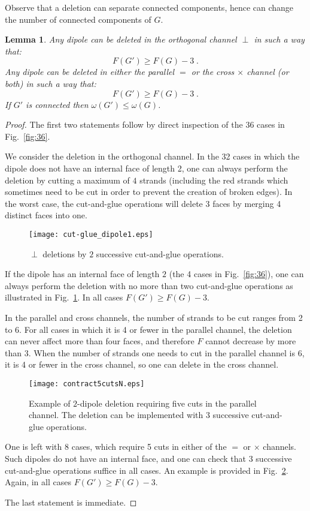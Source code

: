 \documentclass[10pt]{article}
\theoremstyle{plain}
\newtheorem{lemma}{Lemma}
\theoremstyle{definition}
\begin{document}
Observe that a deletion can separate  connected components, hence can change the number of connected components of $G$. 

\begin{lemma} 
 Any dipole can be deleted in the orthogonal channel $\perp$ in such a way that:
 \[
  F(G') \ge F(G)-3 \;.
 \]
 Any dipole can be deleted in either the parallel $=$ or the cross $\times$ channel (or both) in such a way that:
 \[
  F(G') \ge F(G)-3 \;.
 \]
 If $G'$ is connected then $\omega(G')\le \omega(G)$.
\end{lemma}
\begin{proof}
The first two statements follow by direct inspection of the 36 cases in Fig.~\ref{fig:36}. 

We consider the deletion in the orthogonal channel. In the 32 cases in which the dipole does not have an internal face of length 2,
one can always perform the deletion by cutting a maximum of $4$ strands (including the red strands which sometimes need to be cut in order to prevent the creation of broken edges).
In the worst case, the cut-and-glue operations will delete 3 faces by merging 4 distinct faces into one.
 \begin{figure}[htb]
 \begin{center}
 \texttt{[image: cut-glue\_dipole1.eps]}  
 \caption{$\perp$ deletions by $2$ successive cut-and-glue operations.} \label{fig:cut-glue_dipole1}
 \end{center}
 \end{figure}
If the dipole has an internal face of length $2$ (the 4 cases in Fig.~\ref{fig:36}), one can always perform the deletion with no more than two cut-and-glue operations
as illustrated in Fig.~\ref{fig:cut-glue_dipole1}. In all cases $F(G') \ge F(G) - 3$. 
 
In the parallel and cross channels, the number of strands to be cut ranges from 2 to 6. For all cases in which it is 4 or fewer in the parallel channel,
the deletion can never affect more than four faces, and therefore $F$ cannot decrease by more than 3. When the number of strands one needs to cut in the parallel channel is 6, 
it is 4 or fewer in the cross channel, so one can delete in the cross channel. 

 \begin{figure}[htb]
 \begin{center}
 \texttt{[image: contract5cutsN.eps]}  
 \caption{Example of $2$-dipole deletion requiring five cuts in the parallel channel. 
The deletion can be implemented with $3$ successive cut-and-glue operations.} \label{fig:contract5cuts}
 \end{center}
 \end{figure}

One is left with 8 cases, which require 5 cuts in either of the $=$ or $\times$ channels.
Such dipoles do not have an internal face, and one can check that $3$ successive cut-and-glue operations suffice in all cases.
An example is provided in Fig.~\ref{fig:contract5cuts}.
Again, in all cases $F(G') \ge F(G) - 3$. 

The last statement is immediate.

\end{proof}
\end{document}
